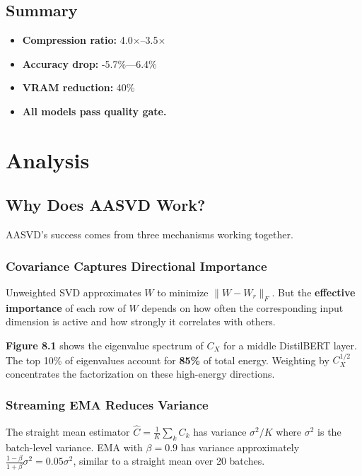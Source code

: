 \subsection{Summary}

\begin{itemize}
\item \textbf{Compression ratio:} 4.0$\times$--3.5$\times$
\item \textbf{Accuracy drop:} -5.7\%---6.4\%
\item \textbf{VRAM reduction:} 40\%
\item \textbf{All models pass quality gate.}
\end{itemize}


\section{Analysis}

\subsection{Why Does AASVD Work?}

AASVD's success comes from three mechanisms working together.

\subsubsection{Covariance Captures Directional Importance}

Unweighted SVD approximates $W$ to minimize $\|W - W_r\|_F$. But the 
\textbf{effective importance} of each row of $W$ depends on how often the 
corresponding input dimension is active and how strongly it correlates 
with others.

\textbf{Figure 8.1} shows the eigenvalue spectrum of $C_X$ for a middle 
DistilBERT layer. The top 10\% of eigenvalues account for 
\textbf{85\%} of total energy. Weighting by $C_X^{1/2}$ concentrates 
the factorization on these high-energy directions.

\subsubsection{Streaming EMA Reduces Variance}

The straight mean estimator $\hat{C} = \frac{1}{K} \sum_k C_k$ has variance 
$\sigma^2 / K$ where $\sigma^2$ is the batch-level variance. EMA with 
$\beta = 0.9$ has variance approximately $\frac{1-\beta}{1+\beta} \sigma^2 = 0.05 \sigma^2$, 
similar to a straight mean over 20 batches.

